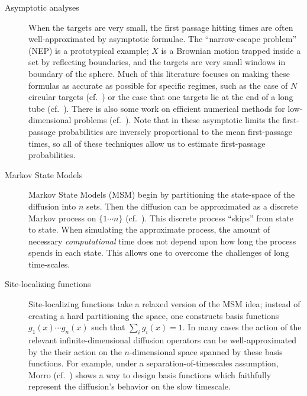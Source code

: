 \documentclass[12pt, nofootinbib,english, amsmath, amssymb, aps, priprint, graphicx,floatfix]{revtex4-1}
\theoremstyle{plain}
\theoremstyle{definition}
\theoremstyle{plain}
\begin{document}
\begin{description}
    \item[Asymptotic analyses] When the targets are very small, the first passage hitting times are often well-approximated by asymptotic formulae.  The ``narrow-escape problem'' (NEP) is a prototypical example; $X$ is a Brownian motion trapped inside a set by reflecting boundaries, and the targets are very small windows in boundary of the sphere.  Much of this literature focuses on making these formulas as accurate as possible for specific regimes, such as the case of $N$ circular targets (cf.\ \cite{cheviakov2010asymptotic}) or the case that one targets lie at the end of a long tube (cf.\ \cite{li2014matched}).  There is also some work on efficient numerical methods for low-dimensional problems (cf.\ \cite{kaye2019fast}).  Note that in these asymptotic limits the first-passage probabilities are inversely proportional to the mean first-passage times, so all of these techniques allow us to estimate first-passage probabilities.  

    \item[Markov State Models] Markov State Models (MSM) begin by partitioning the state-space of the diffusion into $n$ sets.  Then the diffusion can be approximated as a discrete Markov process on $\{1\cdots n\}$ (cf.\ \cite{Pande2010-yi, Chodera2014-bh, Husic2018-xp}).  This discrete process ``skips'' from state to state.  When simulating the approximate process, the amount of necessary \emph{computational} time does not depend upon how long the process spends in each state.  This allows one to overcome the challenges of long time-scales.  

    \item[Site-localizing functions] Site-localizing functions take a relaxed version of the MSM idea; instead of creating a hard partitioning the space, one constructs basis functions $g_1(x)\cdots g_n(x)$ such that $\sum_i g_i(x)=1$.  In many cases the action of the relevant infinite-dimensional diffusion operators can be well-approximated by the their action on the $n$-dimensional space spanned by these basis functions.   For example, under a separation-of-timescales assumption, Morro (cf.\ \cite{moro1995kinetic}) shows a way to design basis functions which faithfully represent the diffusion's behavior on the slow timescale.


\end{description}
\end{document}
